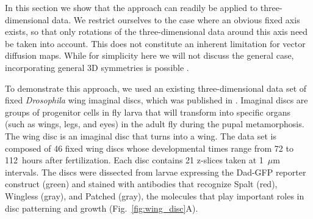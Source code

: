 \documentclass[twocolumn, 10pt]{article}
\newcommand{\fig}[0]{Fig.}
\begin{document}
In this section we show that the approach can readily be applied to three-dimensional data. 
%
We restrict ourselves to the case where an obvious fixed axis exists, so that only rotations of the three-dimensional data around this axis need be taken into account.  
%
This does not constitute an inherent limitation for vector diffusion maps. 
%
While for simplicity here we will not discuss the general  case, incorporating general 3D symmetries is possible \citep{arie2012global, wang2013exact, cucuringu2012eigenvector}. 

%
%

To demonstrate this approach, we used an existing three-dimensional data set of fixed {\em Drosophila} wing imaginal discs, which was published in \citet{hamaratoglu2011dpp}.
%
Imaginal discs are groups of progenitor cells in fly larva that will transform into specific organs (such as wings, legs, and eyes) in the adult fly during the pupal metamorphosis.
%
The wing disc is an imaginal disc that turns into a wing.
%
The data set is composed of 46 fixed wing discs whose developmental times range from 72 to 112~hours after fertilization.
%
Each disc contains 21 z-slices taken at 1~$\mu$m intervals.
%
The discs were dissected from larvae expressing the Dad-GFP reporter construct (green) and stained with antibodies that recognize Spalt (red), Wingless (gray), and Patched (gray), the molecules that play important roles in disc patterning and growth (\fig~\ref{fig:wing_disc}A).
%
\end{document}
